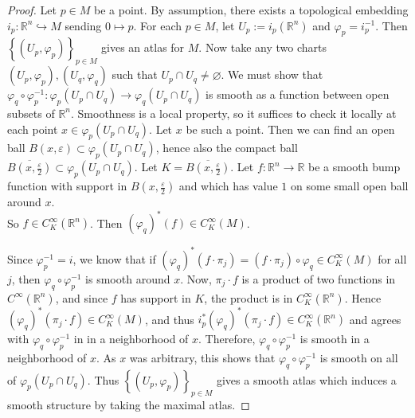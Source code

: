 \documentclass[reqno]{amsart}
\theoremstyle{definition}
\theoremstyle{remark}
\begin{document}
\begin{proof}
        Let $p \in M$ be a point. By assumption, there
        exists a topological embedding $i_p \colon
        \mathbb{R}^{n} \hookrightarrow M$ sending
        $0 \mapsto p$.  For each $p \in M$, let
        $U_p := i_p \left( \mathbb{R}^{n} \right) $ and
        $\varphi_p = i_p^{-1}$. Then
        $\left\{ \left( U_p, \varphi_p \right)  \right\}_{p
        \in M}$ gives an atlas for
        $M$. Now take any two charts
        $\left( U_p, \varphi_p \right) ,
        \left( U_q, \varphi_q \right) $ such that
        $U_p \cap U_q \neq \varnothing$.
        We must show that
        $\varphi_{q} \circ \varphi_{p}^{-1}
        \colon
        \varphi_p \left( U_p \cap U_q \right) 
        \to \varphi_q \left( U_p \cap U_q \right) $ is
        smooth as a function
        between open subsets
        of  $\mathbb{R}^{n}$. Smoothness is a local property, so
        it suffices to check it locally at each point
        $x \in \varphi_p \left( U_p \cap U_q \right) $. Let
        $x$ be such a point. Then we can find an
        open ball $B\left( x, \varepsilon \right) 
        \subset \varphi_p \left( U_p \cap U_q \right) $, hence
        also the compact ball
        $\overline{B \left( x, \frac{\varepsilon}{2} \right) }
        \subset \varphi_p \left( U_p \cap U_q \right) $.
        Let $K = \overline{B\left( x, \frac{\varepsilon}{2}
        \right) }$.
        Let $f \colon
        \mathbb{R}^{n} \to \mathbb{R}$ be
        a smooth bump function with
        support
        in $B \left( x, \frac{\varepsilon}{2} \right) $ and
        which has value $1$ on some small open
        ball around $x$.\\
        So
        $f \in C_K^{\infty}\left( \mathbb{R}^{n} \right) $.
        Then $\left( \varphi_q \right)^*
        (f) \in C_K^{\infty}(M)$.
        
        
        Since $\varphi_p^{-1} =
        i$, we know that if
        $\left( \varphi_q \right)^* \left( f\cdot 
        \pi_j \right) 
        =  (f \cdot \pi_j) \circ \varphi_q \in C_K^{\infty}(M)$
        for all $j$, then
        $\varphi_q \circ \varphi_p^{-1}$ is smooth around
        $x$.
        Now,
        $\pi_j \cdot f$ is a product of two
        functions in
        $C^{\infty}\left( \mathbb{R}^{n} \right) $, and
        since $f$ has support in $K$, the product is
        in $C_{K}^{\infty}\left( \mathbb{R}^{n} \right) $.
        Hence
        $\left( \varphi_q \right)^* 
        \left( \pi_j \cdot  f \right) 
        \in C_{K}^{\infty}(M)$, and thus
        $i_p^{*} \left( \varphi_q \right)^{*}
        \left( \pi_j \cdot f \right) \in C_{K}^{\infty}\left(
        \mathbb{R}^{n} \right) $ and
        agrees with $\varphi_q \circ \varphi_p^{-1}$ in in
        a neighborhood of $x$. Therefore,
        $\varphi_q \circ \varphi_p^{-1}$ is smooth in a
        neighborhood of $x$.
        As $x$ was arbitrary, this shows
        that $\varphi_q \circ \varphi_p^{-1}$ is smooth
        on all of
       $\varphi_p \left( U_p \cap U_q \right) $.
        Thus
        $\left\{ \left( U_p, \varphi_p \right)  \right\}_{
        p \in M}$ gives a smooth atlas which induces
        a smooth structure by taking the maximal atlas.




\end{proof}
\end{document}
